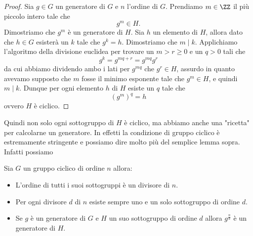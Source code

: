 \documentclass[11pt]{scrartcl}
\begin{document}
	\begin{proof}
		Sia $g\in G$ un generatore di $G$ e $n$ l'ordine di $G$. Prendiamo $m\in\ZZ$ il più piccolo intero tale che 
		$$g^m\in H.$$
		Dimostriamo che $g^m$ è un generatore di $H$. Sia $h$ un elemento di $H$, allora dato che $h\in G$ esisterà un $k$ tale che $g^k=h$. Dimostriamo che $m\mid k$. Applichiamo l'algoritmo della divisione euclidea per trovare un $m>r\ge 0$ e un $q>0$ tali che 
		$$g^k=g^{mq+r}=g^{mq}g^r$$
		da cui abbiamo dividendo ambo i lati per $g^{mq}$ che $g^r\in H$, assurdo in quanto avevamo supposto che $m$ fosse il minimo esponente tale che $g^m\in H$, e quindi $m\mid k$. Dunque per ogni elemento $h$ di $H$ esiste un $q$ tale che 
		$$(g^m)^q=h$$
		ovvero $H$ è ciclico. 
	\end{proof}
	Quindi non solo ogni sottogruppo di $H$ è ciclico, ma abbiamo anche una "ricetta" per calcolarne un generatore. In effetti la condizione di gruppo ciclico è estremamente stringente e possiamo dire molto più del semplice lemma sopra. Infatti possiamo
	\begin{theorem}
		Sia $G$ un gruppo ciclico di ordine $n$ allora:
		\begin{itemize}
			\item L'ordine di tutti i suoi sottogruppi è un divisore di $n$.
			\item Per ogni divisore $d$ di $n$ esiste sempre uno e un solo sottogruppo di ordine $d$.
			\item Se $g$ è un generatore di $G$ e $H$ un suo sottogruppo di ordine $d$ allora $g^{\frac{n}{d}}$ è un generatore di $H$.
		\end{itemize}
	\end{theorem}
\end{document}
